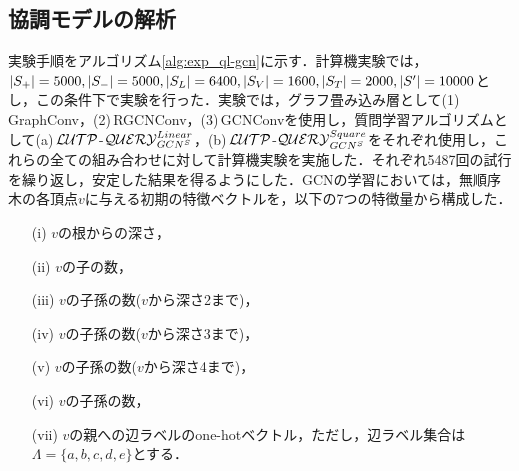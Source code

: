 \subsection{協調モデルの解析}
実験手順をアルゴリズム\ref{alg:exp_ql-gcn}に示す．計算機実験では，$\lvert S_+\rvert=5000, \lvert S_-\rvert=5000, \lvert S_L\rvert=6400, \lvert S_V\rvert=1600, \lvert S_T\rvert=2000, \lvert S'\rvert=10000$とし，この条件下で実験を行った．実験では，グラフ畳み込み層として(1)\,GraphConv，(2)\,RGCNConv，(3)\,GCNConvを使用し，質問学習アルゴリズムとして(a)\,${\cal LUTP}$-${\cal QUERY}_{GCN^S}^{Linear}$，(b)\,${\cal LUTP}$-${\cal QUERY}_{GCN^S}^{Square}$をそれぞれ使用し，これらの全ての組み合わせに対して計算機実験を実施した．それぞれ5487回の試行を繰り返し，安定した結果を得るようにした．GCNの学習においては，無順序木の各頂点$v$に与える初期の特徴ベクトルを，以下の7つの特徴量から構成した．

\begin{enumerate}
  \item[(i)] $v$の根からの深さ，
  \item[(ii)] $v$の子の数，
  \item[(iii)] $v$の子孫の数($v$から深さ2まで)，
  \item[(iv)]$v$の子孫の数($v$から深さ3まで)，
  \item[(v)] $v$の子孫の数($v$から深さ4まで)，
  \item[(vi)] $v$の子孫の数，
  \item[(vii)] $v$の親への辺ラベルのone-hotベクトル，ただし，辺ラベル集合は$\Lambda=\{a,b,c,d,e\}$とする．
\end{enumerate}

